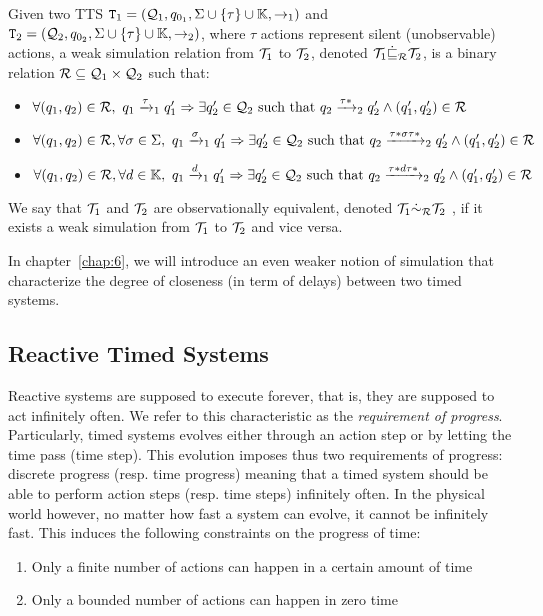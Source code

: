 \begin{definition}\label{def:wsim}
  Given two TTS $\texttt{T}_{1}=(\mathcal{Q}_{1},q_{0_{1}},\Sigma \cup\{\tau\}\cup\mathbb{K},\to_{1})$ and $\texttt{T}_{2}=(\mathcal{Q}_{2},q_{0_{2}},\Sigma \cup\{\tau\}\cup\mathbb{K},\to_{2})$, where $\tau$ actions 
  represent silent (unobservable) actions, a weak simulation relation from 
  $\mathcal{T}_1$ to $\mathcal{T}_2$, denoted $\mathcal{T}_1\dot{\sqsubseteq}_{\mathcal{R}}\mathcal{T}_2$, 
  is a binary relation $\mathcal{R}\subseteq\mathcal{Q}_1
  \times\mathcal{Q}_2$ such that:
  \begin{itemize}
    \item $\forall(q_1,q_2)\in\mc{R},\ 
      q_1\transitb{\tau}{1}q_1'\Rightarrow\exists q'_2\in\mc{Q}_2 
      \text{ such that } q_2\transitb{\tau*}{2}q_2'\wedge
      (q_1',q_2')\in\mc{R}$
    \item $\forall(q_1,q_2)\in\mc{R},\forall\sigma\in\Sigma,\ 
      q_1\transitb{\sigma}{1}q_1'\Rightarrow\exists q'_2\in\mc{Q}_2 
      \text{ such that } q_2\transitb{\tau*\sigma\tau*}{2}q_2'\wedge
      (q_1',q_2')\in\mc{R}$
    \item $\forall(q_1,q_2)\in\mc{R},\forall d\in\mb{K},\ 
      q_1\transitb{d}{1}q_1'\Rightarrow\exists q'_2\in\mc{Q}_2 
      \text{ such that } q_2\transitb{\tau*d\tau*}{2}q_2'\wedge
      (q_1',q_2')\in\mc{R}$
  \end{itemize}
\end{definition}
  We say that $\mathcal{T}_1$ and $\mathcal{T}_2$ are observationally equivalent,
  denoted $\mathcal{T}_1\dot{\sim}_{\mathcal{R}}\mathcal{T}_2$ , if it exists a weak simulation 
  from $\mathcal{T}_1$ to $\mathcal{T}_2$ and vice versa.
  
  In chapter~\ref{chap:6}, we will introduce an even weaker notion of simulation 
  that characterize the degree of closeness (in term of delays)
  between two timed systems. 

\subsection{Reactive Timed Systems}
Reactive systems are supposed to execute forever, that is,
they are supposed to act infinitely often. We refer to this characteristic as 
the \emph{requirement of progress}. 
Particularly, timed systems evolves either through an action step or 
by letting the time pass (time step).
This evolution imposes thus two requirements of progress:
discrete progress (resp. time progress) meaning that a timed system
should be able to perform action steps (resp. time steps) infinitely
often. In the physical world however, no matter how fast a system can
evolve, it cannot be infinitely fast. This induces the following constraints
on the progress of time:
\begin{enumerate}
  \item Only a finite number of actions can happen in a certain amount of time
  \item Only a bounded number of actions can happen in zero time
\end{enumerate}

